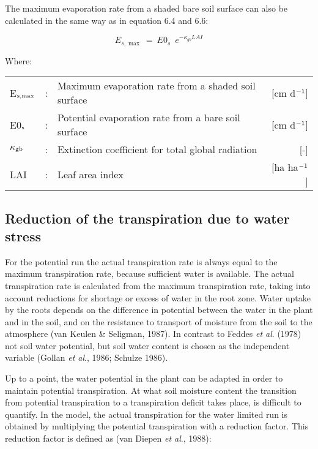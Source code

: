 The maximum evaporation rate from a shaded bare soil surface can also be calculated in
the same way as in equation 6.4 and 6.6:

\begin{equation}
E_{s,\max } ~=~ E0 _{s} \,\,\, e ^{-\kappa  _{gb} LAI}
\end{equation}

Where:\\
\begin{tabularx}{\textwidth}{llXr}
E$_{{\rm s,max}}$ &:& Maximum evaporation rate from a shaded 
    soil surface & [cm d$^{{\rm -1}}$]\\
E0$_{{\rm s}}$ &:& Potential evaporation rate from a bare soil 
    surface & [cm d$^{{\rm -1}}$]\\
$\kappa$$_{{\rm gb}}$ &:& Extinction coefficient for total global radiation & [-]\\
LAI &:& Leaf area index & [ha ha$^{{\rm -1}}$]\\
\end{tabularx}

\subsection{Reduction of the transpiration due to water stress}

For the potential run the actual transpiration rate is always equal to the maximum
transpira\-tion rate, because sufficient water is available. The actual transpiration rate is
calculated from the maximum transpiration rate, taking into account reductions for
shortage or excess of water in the root zone. Water uptake by the roots depends on the
difference in potential between the water in the plant and in the soil, and on the resistance
to transport of moisture from the soil to the atmosphere (van Keulen \& Seligman, 1987).
In contrast to Feddes {\it et al\/}. (1978) not soil water potential, but soil water content is
chosen as the independent variable (Gollan {\it et al\/}., 1986; Schulze 1986).

Up to a point, the water potential in the plant can be adapted in order to maintain
potential transpiration. At what soil moisture content the transition from potential
transpiration to a transpiration deficit takes place, is difficult to quantify. In the model,
the actual transpira\-tion for the water limited run is obtained by multiplying the potential
transpiration with a reduction factor. This reduction factor is defined as (van Diepen {\it et
al\/}., 1988):

